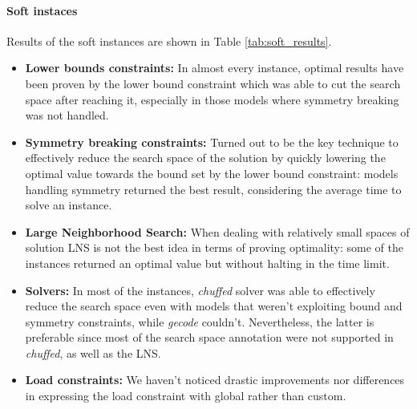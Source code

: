 \paragraph{Soft instaces} Results of the soft instances are shown in Table \ref{tab:soft_results}.
\begin{itemize}
    \item \textbf{Lower bounds constraints:} In almost every instance, optimal results have been proven by the lower bound constraint which was able to cut the search space after reaching it, especially in those models where symmetry breaking was not handled.  
    \item \textbf{Symmetry breaking constraints:} Turned out to be the key technique to effectively reduce the search space of the solution by quickly lowering the optimal value towards the bound set by the lower bound constraint: models handling symmetry returned the best result, considering the average time to solve an instance.
    \item \textbf{Large Neighborhood Search:} When dealing with relatively small spaces of solution LNS is not the best idea in terms of proving optimality: some of the instances returned an optimal value but without halting in the time limit.
    \item \textbf{Solvers:} In most of the instances, \textit{chuffed} solver was able to effectively reduce the search space even with models that weren't exploiting bound and symmetry constraints, while \textit{gecode} couldn't. Nevertheless, the latter is preferable since most of the search space annotation were not supported in \textit{chuffed}, as well as the LNS.   
    \item \textbf{Load constraints:} We haven't noticed drastic improvements nor differences in expressing the load constraint with global rather than custom.
\end{itemize}

